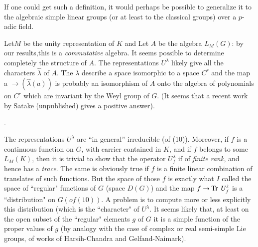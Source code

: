   If one could get such a definition, it would perhaps be possible to
  generalize it to the algebraic simple linear groups (or at least to
  the classical groups) over a $p$-adic field. 
  
  
  Let\pageoriginale $M$ be the unity representation of $K$ and Let $A$ be the
  algebra $L_M(G)$: by our results,this is a \textit{commutative}
  algebra. It seems possible to determine completely the structure of
  $A$. The representations $U^\lambda$ likely give all the characters
  $\hat{\lambda}$ of $A$. The $\lambda$ describe a space isomorphic to
  a space $C^r$ and the map a $\rightarrow (\hat{\lambda}(a))$ is
  probably an isomorphism of $A$ onto the algebra of polynomials on
  $C^r$ which are invariant by the Weyl group of $G$. (It seems that a
  recent work by Satake (unpublished) gives a positive answer). 
  
.

  The representations $U^\lambda$ are ``in general'' irreducible (of
  (10)). Moreover, if $f$ is a continuous function on $G$, with
  carrier contained in $K$, and if $f$ belongs to some $L_M(K)$, then
  it is trivial to show that the operator $U^\lambda_f$ if of
  \textit{finite rank}, and hence has a \textit{trace}. The same is
  obviously true if $f$ is a finite linear combination of translates
  of such functions. But the space of those $f$ is exactly what $I$
  called the space of ``regular" functions of $G$ (space $D(G)$) and
  the map $f \rightarrow \operatorname{Tr} ~U^\lambda_f$ is a ``distribution" on
  $G(of(10))$. A problem is to compute more or less explicitly this
  distribution (which is the ``character" of $U^\lambda$. It seems
  likely that, at least on the open subset of the ``regular" elements
  $g$ of $G$ it is a simple function of the  proper values of $g$ (by
  analogy with the case of complex or real semi-simple Lie groups, of
  works of Harsih-Chandra and Gelfand-Naimark).
